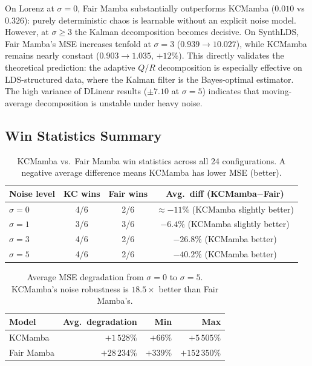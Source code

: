 On Lorenz at $\sigma=0$, Fair Mamba substantially outperforms KCMamba ($0{.}010$ vs
$0{.}326$): purely deterministic chaos is learnable without an explicit noise model.
However, at $\sigma{\geq}3$ the Kalman decomposition becomes decisive.
On SynthLDS, Fair Mamba's MSE increases tenfold at $\sigma=3$
($0{.}939 \to 10{.}027$), while KCMamba remains nearly constant
($0{.}903 \to 1{.}035$, $+12\%$).
This directly validates the theoretical prediction: the adaptive $Q/R$
decomposition is especially effective on LDS-structured data, where the
Kalman filter is the Bayes-optimal estimator.
The high variance of DLinear results (${\pm}7{.}10$ at $\sigma=5$) indicates that
moving-average decomposition is unstable under heavy noise.

\subsection{Win Statistics Summary}

\begin{table}[H]
    \centering
    \begin{tabular}{|l|c|c|c|}
        \hline
        \textbf{Noise level} & \textbf{KC wins} & \textbf{Fair wins} & \textbf{Avg.\ diff (KCMamba$-$Fair)} \\
        \hline\hline
        $\sigma = 0$ & 4/6 & 2/6 & $\approx{-}11\%$ (KCMamba slightly better) \\
        $\sigma = 1$ & 3/6 & 3/6 & $-6.4\%$    (KCMamba slightly better) \\
        $\sigma = 3$ & 4/6 & 2/6 & $-26.8\%$   (KCMamba better) \\
        $\sigma = 5$ & 4/6 & 2/6 & $-40.2\%$   (KCMamba better) \\
        \hline
    \end{tabular}
    \caption{KCMamba vs.\ Fair Mamba win statistics across all 24 configurations.
             A negative average difference means KCMamba has lower MSE (better).}
    \label{tab:win_stats}
\end{table}

\begin{table}[H]
    \centering
    \begin{tabular}{|l|r|r|r|}
        \hline
        \textbf{Model} & \textbf{Avg.\ degradation} & \textbf{Min} & \textbf{Max} \\
        \hline\hline
        KCMamba         & $+1\,528\%$ & $+66\%$ & $+5\,505\%$ \\
        Fair Mamba                 & $+28\,234\%$ & $+339\%$ & $+152\,350\%$ \\
        \hline
    \end{tabular}
    \caption{Average MSE degradation from $\sigma=0$ to $\sigma=5$.
             KCMamba's noise robustness is $18.5\times$ better
             than Fair Mamba's.}
    \label{tab:degradation}
\end{table}

